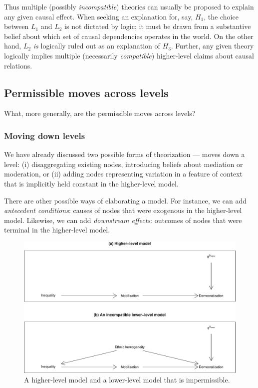 \documentclass[12pt,]{book}
\begin{document}
Thus multiple (possibly \emph{incompatible}) theories can usually be proposed to explain any given causal effect. When seeking an explanation for, say, \(H_1\), the choice between \(L_1\) and \(L_2\) is not dictated by logic; it must be drawn from a substantive belief about which set of causal dependencies operates in the world. On the other hand, \(L_2\) \emph{is} logically ruled out as an explanation of \(H_3\). Further, any given theory logically implies multiple (necessarily \emph{compatible}) higher-level claims about causal relations.

\hypertarget{permissible-moves-across-levels}{%
\subsection{Permissible moves across levels}\label{permissible-moves-across-levels}}

What, more generally, are the permissible moves across levels?

\hypertarget{moving-down-levels}{%
\subsubsection{Moving down levels}\label{moving-down-levels}}

We have already discussed two possible forms of theorization --- moves down a level: (i) disaggregating existing nodes, introducing beliefs about mediation or moderation, or (ii) adding nodes representing variation in a feature of context that is implicitly held constant in the higher-level model.

There are other possible ways of elaborating a model. For instance, we can add \emph{antecedent conditions}: causes of nodes that were exogenous in the higher-level model. Likewise, we can add \emph{downstream effects}: outcomes of nodes that were terminal in the higher-level model.

\begin{figure}

{\centering \includegraphics[width=.7\textwidth]{ii_files/figure-latex/incompat-1} 

}

\caption{A higher-level model and a lower-level model that is impermissible.}\label{fig:incompat}
\end{figure}
\end{document}
